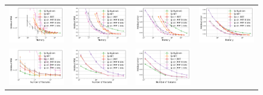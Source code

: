 \begin{figure}
	\centering
	\begin{tabular}{c@{\hskip 0in}c@{\hskip 0in}c@{\hskip 0in}c}
		\includegraphics[width=0.3\linewidth]{figures/census_MSE_vs_n_memory.pdf} &
		\includegraphics[width=0.3\linewidth]{figures/yearpred_MSE_vs_n_memory.pdf} &
		\includegraphics[width=0.3\linewidth]{figures/covtype_error_vs_n_memory.pdf} &
		\includegraphics[width=0.3\linewidth]{figures/timit_error_vs_n_memory.pdf} \\
		\includegraphics[width=0.3\linewidth]{figures/census_MSE_vs_n_feat.pdf} &
		\includegraphics[width=0.3\linewidth]{figures/yearpred_MSE_vs_n_feat.pdf} &
		\includegraphics[width=0.3\linewidth]{figures/covtype_error_vs_n_feat.pdf} &

\end{tabular}
\end{figure}

